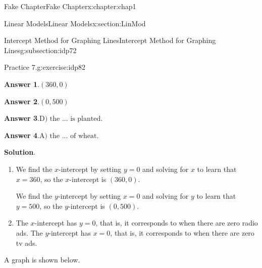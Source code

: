 \documentclass[oneside,10pt,]{book}
\newcommand{\blocktitlefont}{\relax}
\numberwithin{equation}{section}
\begin{document}
\begin{chapterptx}{Fake Chapter}{}{Fake Chapter}{}{}{x:chapter:chap1}
\begin{sectionptx}{Linear Models}{}{Linear Models}{}{}{x:section:LinMod}
\begin{subsectionptx}{Intercept Method for Graphing Lines}{}{Intercept Method for Graphing Lines}{}{}{g:subsection:idp72}
\begin{inlineexercise}{Practice 7.}{g:exercise:idp82}
\begin{enumerate}[label=\alph*.]
\begin{itemize}[label=$\odot$,leftmargin=3em,]
\end{itemize}
%
\end{enumerate}
%
\par\smallskip%
\noindent\textbf{\blocktitlefont Answer 1}.\hypertarget{g:answer:idp83}{}\quad{}\(\left(360,0\right)\)%
\par\smallskip%
\noindent\textbf{\blocktitlefont Answer 2}.\hypertarget{g:answer:idp84}{}\quad{}\(\left(0,500\right)\)%
\par\smallskip%
\noindent\textbf{\blocktitlefont Answer 3}.\hypertarget{g:answer:idp85}{}\quad{}\(\text{D) the ... is planted.}\)%
\par\smallskip%
\noindent\textbf{\blocktitlefont Answer 4}.\hypertarget{g:answer:idp86}{}\quad{}\(\text{A) the ... of wheat.}\)%
\par\smallskip%
\noindent\textbf{\blocktitlefont Solution}.\hypertarget{g:solution:idp87}{}\quad{}%
\begin{enumerate}[label=\alph*.]
\item{}We find the \(x\)-intercept by setting \(y=0\) and solving for \(x\) to learn that \(x=360\text{,}\) so the \(x\)-intercept is \({\left(360,0\right)}\text{.}\)%
\par
We find the \(y\)-intercept by setting \(x=0\) and solving for \(y\) to learn that \(y=500\text{,}\) so the \(y\)-intercept is \({\left(0,500\right)}\text{.}\)%
\item{}The \(x\)-intercept has \(y=0\text{,}\) that is, it corresponds to when there are zero radio ads. The \(y\)-intercept has \(x=0\text{,}\) that is, it corresponds to when there are zero tv ads.%
\end{enumerate}
%
\par\medskip\noindent A graph is shown below.%
\begin{sidebyside}{1}{0.375}{0.375}{0}%
\begin{sbspanel}{0.25}%

\end{sbspanel}
\end{sidebyside}
\end{inlineexercise}
\end{subsectionptx}
\end{sectionptx}
\end{chapterptx}
\end{document}
